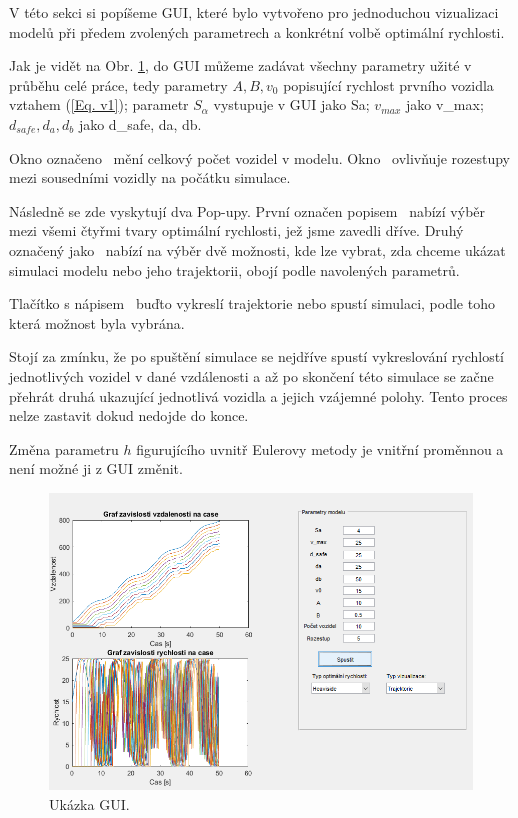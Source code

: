 \documentclass[a4paper, 12pt, fleqn]{article}
\begin{document}
V této sekci si popíšeme GUI, které bylo vytvořeno pro jednoduchou vizualizaci modelů při předem zvolených parametrech a konkrétní volbě optimální rychlosti. 

Jak je vidět na Obr. \ref{Obr: GUI}, do GUI můžeme zadávat všechny parametry užité v průběhu celé práce, tedy parametry $ A, B, v_{0} $ popisující rychlost prvního vozidla vztahem (\ref{Eq. v1}); parametr $ S_{\alpha} $ vystupuje v GUI jako Sa; $ v_{max} $ jako v\_max; $ d_{safe}, d_{a}, d_{b} $ jako d\_safe, da, db.

Okno označeno  ~mění celkový počet vozidel v modelu. Okno   ~ovlivňuje rozestupy mezi sousedními vozidly na počátku simulace.

Následně se zde vyskytují dva Pop-upy. První označen popisem ~nabízí výběr mezi všemi čtyřmi tvary optimální rychlosti, jež jsme zavedli dříve. Druhý označený jako   ~nabízí na výběr dvě možnosti, kde lze vybrat, zda chceme ukázat simulaci modelu nebo jeho trajektorii, obojí podle navolených parametrů.

Tlačítko s nápisem  ~buďto vykreslí trajektorie nebo spustí simulaci, podle toho která možnost byla vybrána.

Stojí za zmínku, že po spuštění simulace se nejdříve spustí vykreslování rychlostí jednotlivých vozidel v dané vzdálenosti a až po skončení této simulace se začne přehrát druhá ukazující jednotlivá vozidla a jejich vzájemné polohy. Tento proces nelze zastavit dokud nedojde do konce.

Změna parametru $ h $ figurujícího uvnitř Eulerovy metody je vnitřní proměnnou a není možné ji z GUI změnit. 

\begin{figure}
	\centering
	\includegraphics[width=\textwidth]{images/gui.png}
	\caption{Ukázka GUI.}
	\label{Obr: GUI}
\end{figure}
\end{document}
